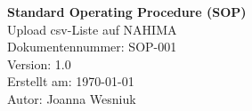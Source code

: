 \documentclass[12pt,a4paper]{article}
\newcommand{\SOPTitel}{Upload csv-Liste auf NAHIMA}
\newcommand{\SOPNummer}{SOP-001}
\newcommand{\SOPVersion}{1.0}
\newcommand{\SOPAutor}{Joanna Wesniuk}
\newcommand{\SOPDatum}{\today}
\begin{document}
\begin{center}
    \Huge \textbf{Standard Operating Procedure (SOP)} \\
    \vspace{0.5cm}
    \Large \SOPTitel \\
    \vspace{1cm}
    \normalsize
    Dokumentennummer: \SOPNummer \\
    Version: \SOPVersion \\
    Erstellt am: \SOPDatum \\
    Autor: \SOPAutor \\
\end{center}

\newpage

\tableofcontents
\newpage


\end{document}
